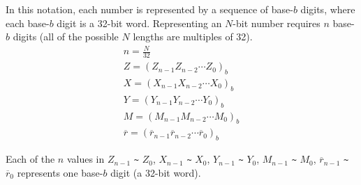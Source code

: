 \documentclass[main\_\_EN.tex]{subfiles}
\begin{document}
In this notation, each number is represented by a sequence of base-\begin{math}b\end{math} digits, where each base-\begin{math}b\end{math} digit is a 32-bit word. Representing an \begin{math}N\end{math}-bit number requires \begin{math}n\end{math} base-\begin{math}b\end{math} digits (all of the possible \begin{math}N\end{math} lengths are multiples of 32).
\begin{gather*}
    n = \frac{N}{32} \\
    Z = ( Z_{n-1} Z_{n-2} \cdots Z_{0} )_{b} \\
    X = ( X_{n-1} X_{n-2} \cdots X_{0} )_{b} \\
    Y = ( Y_{n-1} Y_{n-2} \cdots Y_{0} )_{b} \\
    M = ( M_{n-1} M_{n-2} \cdots M_{0} )_{b} \\
    \overline{r} = ( \overline{r}_{n-1} \overline{r}_{n-2} \cdots \overline{r}_{0} )_{b}
\end{gather*}

Each of the \begin{math}n\end{math} values in 
\begin{math}Z_{n-1}\end{math} \verb+~+ \begin{math}Z_{0}\end{math},
\begin{math}X_{n-1}\end{math} \verb+~+ \begin{math}X_{0}\end{math},
\begin{math}Y_{n-1}\end{math} \verb+~+ \begin{math}Y_{0}\end{math},
\begin{math}M_{n-1}\end{math} \verb+~+ \begin{math}M_{0}\end{math},
\begin{math}\overline{r}_{n-1}\end{math} \verb+~+ \begin{math}\overline{r}_{0}\end{math} represents one base-\begin{math}b\end{math} digit (a 32-bit word).
\end{document}
